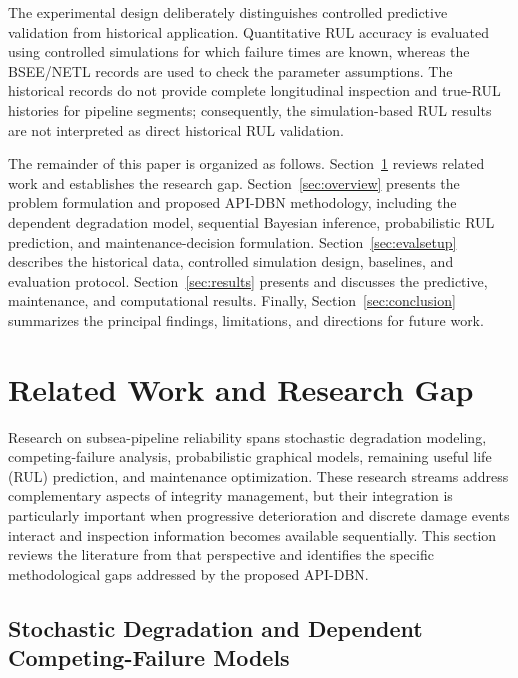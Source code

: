 \documentclass[journal]{IEEEtran}
\begin{document}
The experimental design deliberately distinguishes controlled
predictive validation from historical application. Quantitative RUL
accuracy is evaluated using controlled simulations for which failure
times are known, whereas the BSEE/NETL records are used to check the
parameter assumptions. The historical records do not provide complete
longitudinal inspection and true-RUL histories for pipeline segments;
consequently, the simulation-based RUL results are not interpreted as
direct historical RUL validation.

The remainder of this paper is organized as follows.
Section~\ref{sec:lit} reviews related work and establishes the research
gap. Section~\ref{sec:overview} presents the problem formulation and
proposed API-DBN methodology, including the dependent degradation
model, sequential Bayesian inference, probabilistic RUL prediction,
and maintenance-decision formulation. Section~\ref{sec:evalsetup}
describes the historical data, controlled simulation design, baselines,
and evaluation protocol. Section~\ref{sec:results} presents and
discusses the predictive, maintenance, and
computational results. Finally, Section~\ref{sec:conclusion}
summarizes the principal findings, limitations, and directions for
future work.

\section{Related Work and Research Gap}
\label{sec:lit}

Research on subsea-pipeline reliability spans stochastic degradation
modeling, competing-failure analysis, probabilistic graphical models,
remaining useful life (RUL) prediction, and maintenance optimization.
These research streams address complementary aspects of integrity
management, but their integration is particularly important when
progressive deterioration and discrete damage events interact and
inspection information becomes available sequentially. This section
reviews the literature from that perspective and identifies the
specific methodological gaps addressed by the proposed API-DBN.



\subsection{Stochastic Degradation and Dependent Competing-Failure Models}
\label{sec:lit_degradation}
\end{document}
